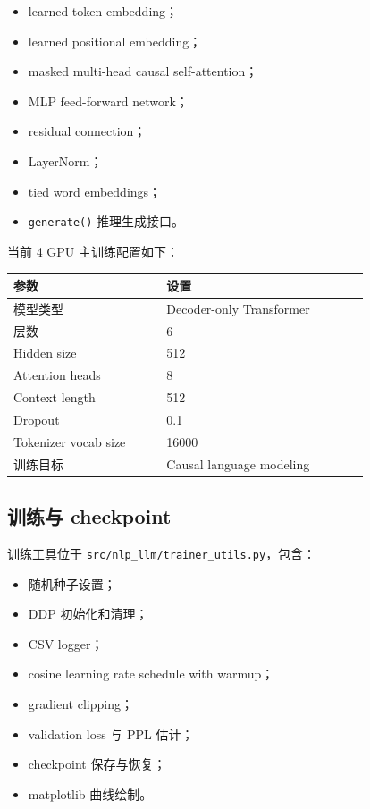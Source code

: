 \documentclass[UTF8,zihao=-4]{ctexart}
\begin{document}
\begin{itemize}
  \item learned token embedding；
  \item learned positional embedding；
  \item masked multi-head causal self-attention；
  \item MLP feed-forward network；
  \item residual connection；
  \item LayerNorm；
  \item tied word embeddings；
  \item \texttt{generate()} 推理生成接口。
\end{itemize}

当前 4 GPU 主训练配置如下：

\begin{longtable}{>{\raggedright\arraybackslash}p{0.34\linewidth}p{0.45\linewidth}}
\toprule
\textbf{参数} & \textbf{设置} \\
\midrule
模型类型 & Decoder-only Transformer \\
层数 & 6 \\
Hidden size & 512 \\
Attention heads & 8 \\
Context length & 512 \\
Dropout & 0.1 \\
Tokenizer vocab size & 16000 \\
训练目标 & Causal language modeling \\
\bottomrule
\end{longtable}

\subsection{训练与 checkpoint}

训练工具位于 \texttt{src/nlp\_llm/trainer\_utils.py}，包含：

\begin{itemize}
  \item 随机种子设置；
  \item DDP 初始化和清理；
  \item CSV logger；
  \item cosine learning rate schedule with warmup；
  \item gradient clipping；
  \item validation loss 与 PPL 估计；
  \item checkpoint 保存与恢复；
  \item matplotlib 曲线绘制。
\end{itemize}
\end{document}
